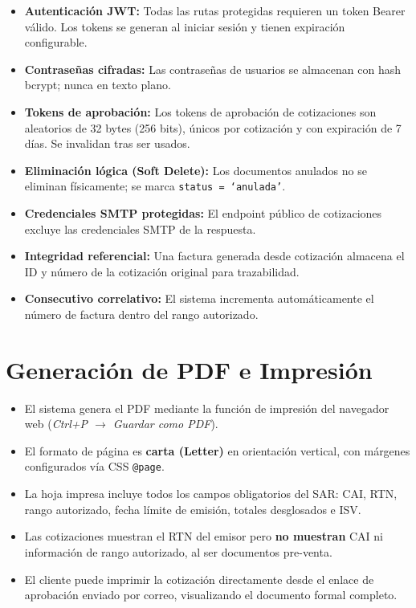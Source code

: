\documentclass[12pt, letterpaper]{article}
\begin{document}
\begin{itemize}
  \item \textbf{Autenticación JWT:} Todas las rutas protegidas requieren un
        token Bearer válido. Los tokens se generan al iniciar sesión y tienen
        expiración configurable.
  \item \textbf{Contraseñas cifradas:} Las contraseñas de usuarios se almacenan
        con hash bcrypt; nunca en texto plano.
  \item \textbf{Tokens de aprobación:} Los tokens de aprobación de cotizaciones
        son aleatorios de 32 bytes (256 bits), únicos por cotización y con
        expiración de 7 días. Se invalidan tras ser usados.
  \item \textbf{Eliminación lógica (Soft Delete):} Los documentos anulados
        no se eliminan físicamente; se marca \texttt{status = `anulada'}.
  \item \textbf{Credenciales SMTP protegidas:} El endpoint público de
        cotizaciones excluye las credenciales SMTP de la respuesta.
  \item \textbf{Integridad referencial:} Una factura generada desde cotización
        almacena el ID y número de la cotización original para trazabilidad.
  \item \textbf{Consecutivo correlativo:} El sistema incrementa automáticamente
        el número de factura dentro del rango autorizado.
\end{itemize}

\section{Generación de PDF e Impresión}

\begin{itemize}
  \item El sistema genera el PDF mediante la función de impresión del
        navegador web (\textit{Ctrl+P $\rightarrow$ Guardar como PDF}).
  \item El formato de página es \textbf{carta (Letter)} en orientación
        vertical, con márgenes configurados vía CSS \texttt{@page}.
  \item La hoja impresa incluye todos los campos obligatorios del SAR:
        CAI, RTN, rango autorizado, fecha límite de emisión, totales
        desglosados e ISV.
  \item Las cotizaciones muestran el RTN del emisor pero \textbf{no muestran}
        CAI ni información de rango autorizado, al ser documentos pre-venta.
  \item El cliente puede imprimir la cotización directamente desde el
        enlace de aprobación enviado por correo, visualizando el documento
        formal completo.
\end{itemize}
\end{document}
